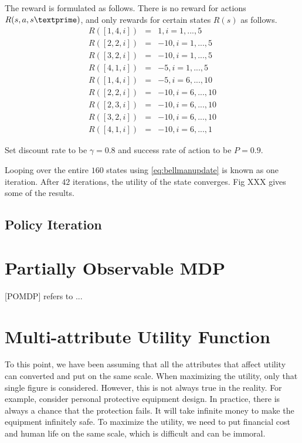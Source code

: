 The reward is formulated as follows. There is no reward for actions $R(s, a, s\textprime)$, and only rewards for certain states $R(s)$ as follows.
\begin{eqnarray}
	R([1,4,i]) &=& 1, i=1,...,5 \nonumber \\
	R([2,2,i]) &=& -10, i=1,...,5 \nonumber \\
	R([3,2,i]) &=& -10, i=1,...,5 \nonumber \\
	R([4,1,i]) &=& -5, i=1,...,5 \nonumber \\
	R([1,4,i]) &=& -5, i=6,...,10 \nonumber \\
	R([2,2,i]) &=& -10, i=6,...,10 \nonumber \\
	R([2,3,i]) &=& -10, i=6,...,10 \nonumber \\
	R([3,2,i]) &=& -10, i=6,...,10 \nonumber \\
	R([4,1,i]) &=& -10, i=6,...,1 \nonumber
\end{eqnarray}

Set discount rate to be $\gamma=0.8$ and success rate of action to be $P=0.9$.

Looping over the entire $160$ states using \eqref{eq:bellmanupdate} is known as one iteration. After $42$ iterations, the utility of the state converges. Fig XXX gives some of the results.
















\subsection{Policy Iteration}

\section{Partially Observable MDP} \label{sec:pomdp}

[POMDP] refers to ...

\section{Multi-attribute Utility Function}

To this point, we have been assuming that all the attributes that affect utility can converted and put on the same scale. When maximizing the utility, only that single figure is considered. However, this is not always true in the reality. For example, consider personal protective equipment design. In practice, there is always a chance that the protection fails. It will take infinite money to make the equipment infinitely safe. To maximize the utility, we need to put financial cost and human life on the same scale, which is difficult and can be immoral.

